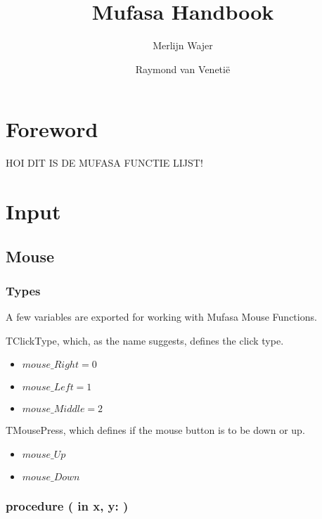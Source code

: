 \documentclass[a4paper]{report}
\begin{document}
\title{Mufasa Handbook}
\author{Merlijn Wajer \and Raymond van Veneti\"{e}}


\maketitle
\tableofcontents

\chapter{Foreword}

HOI DIT IS DE MUFASA FUNCTIE LIJST!

\chapter{Input}

\section{Mouse}

\subsection{Types}

A few variables are exported for working with Mufasa Mouse Functions.

TClickType, which, as the name suggests, defines the click type.
\begin{itemize}
	\item $mouse\_Right = 0$ 
	\item $mouse\_Left = 1$
	\item $mouse\_Middle = 2$
\end{itemize}

TMousePress, which defines if the mouse button is to be down or up.
\begin{itemize}
	\item $mouse\_Up$
	\item $mouse\_Down$
\end{itemize}


\subsection{\textbf{procedure} {\color{blue}{MoveMouse}}({\color{typeRed}
{in x, y: }}{\color{typeGreen}{Integer}})}
\end{document}
